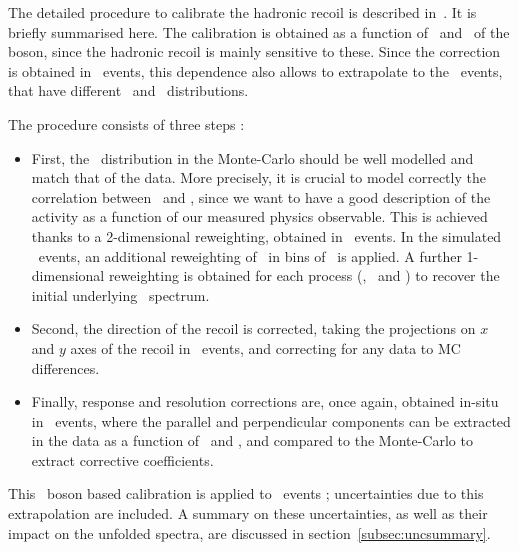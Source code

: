The detailed procedure to calibrate the hadronic recoil is described in~\cite{Li:2657182}. It is briefly summarised here. The calibration is obtained as a function of \setue\ and \ptv\ of the boson, since the hadronic recoil is mainly sensitive to these. Since the correction is obtained in \Zboson\ events, this dependence also allows to extrapolate to the \Wboson\ events, that have different \setue\ and \ptv\ distributions.
%

The procedure consists of three steps :
\begin{itemize}
	\item First, the \setue\ distribution in the Monte-Carlo should be well modelled and match that of the data. More precisely, it is crucial to model correctly the correlation between \setue\ and \ptv, since we want to have a good description of the activity as a function of our measured physics observable. This is achieved thanks to a 2-dimensional reweighting, obtained in \Zboson\ events. In the simulated \Wboson\ events, an additional reweighting of \setue\ in bins of \ut\ is applied. A further 1-dimensional reweighting is obtained for each process (\Wminus, \Wplus\ and \Zboson) to recover the initial underlying \pttruth\ spectrum.

	\item Second, the direction of the recoil is corrected, taking the projections on $x$ and $y$ axes of the recoil in \Zboson\ events, and correcting for any data to MC differences.

	\item Finally, response and resolution corrections are, once again, obtained in-situ in \Zboson\ events, where the parallel and perpendicular components can be extracted in the data as a function of \setue\ and \ptll, and compared to the Monte-Carlo to extract corrective coefficients.
\end{itemize}

This \Zboson\ boson based calibration is applied to \Wboson\ events ; uncertainties due to this extrapolation are included. A summary on these uncertainties, as well as their impact on the unfolded spectra, are discussed in section~\ref{subsec:uncsummary}.
